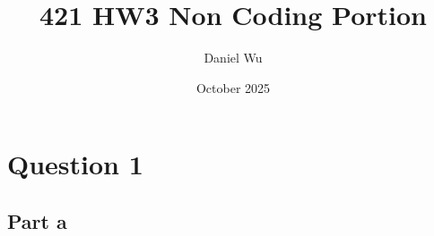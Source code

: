 \documentclass{article}
\title{421 HW3 Non Coding Portion}
\author{Daniel Wu}
\date{October 2025}
\begin{document}
\maketitle

\section{Question 1}
\subsection{Part a}
\textcolor{blue}{}
\end{document}
